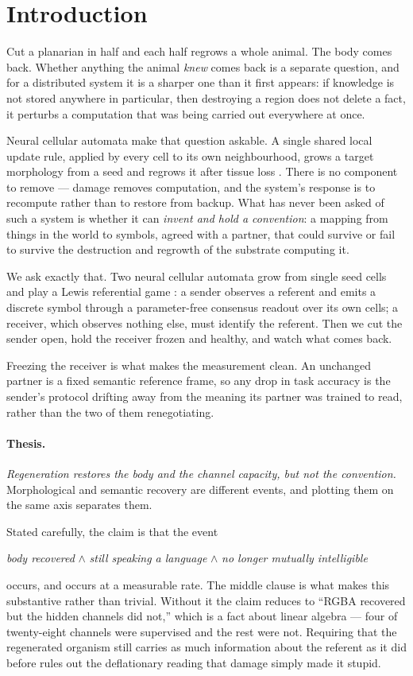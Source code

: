 \section{Introduction}
\label{sec:intro}

Cut a planarian in half and each half regrows a whole animal. The body comes
back. Whether anything the animal \emph{knew} comes back is a separate question,
and for a distributed system it is a sharper one than it first appears: if
knowledge is not stored anywhere in particular, then destroying a region does not
delete a fact, it perturbs a computation that was being carried out everywhere at
once.

Neural cellular automata make that question askable. A single shared local update
rule, applied by every cell to its own neighbourhood, grows a target morphology
from a seed and regrows it after tissue loss
\citep{mordvintsev2020growing}. There is no component to remove --- damage
removes computation, and the system's response is to recompute rather than to
restore from backup. What has never been asked of such a system is whether it can
\emph{invent and hold a convention}: a mapping from things in the world to
symbols, agreed with a partner, that could survive or fail to survive the
destruction and regrowth of the substrate computing it.

We ask exactly that. Two neural cellular automata grow from single seed cells and
play a Lewis referential game \citep{lewis1969convention}: a sender observes a
referent and emits a discrete symbol through a parameter-free consensus readout
over its own cells; a receiver, which observes nothing else, must identify the
referent. Then we cut the sender open, hold the receiver frozen and healthy, and
watch what comes back.

Freezing the receiver is what makes the measurement clean. An unchanged partner
is a fixed semantic reference frame, so any drop in task accuracy is the sender's
protocol drifting away from the meaning its partner was trained to read, rather
than the two of them renegotiating.

\paragraph{Thesis.} \emph{Regeneration restores the body and the channel
capacity, but not the convention.} Morphological and semantic recovery are
different events, and plotting them on the same axis separates them.

Stated carefully, the claim is that the event
%
\begin{center}
  \emph{body recovered} $\wedge$ \emph{still speaking a language} $\wedge$
  \emph{no longer mutually intelligible}
\end{center}
%
occurs, and occurs at a measurable rate. The middle clause is what makes this
substantive rather than trivial. Without it the claim reduces to ``RGBA recovered
but the hidden channels did not,'' which is a fact about linear algebra --- four
of twenty-eight channels were supervised and the rest were not. Requiring that
the regenerated organism still carries as much information about the referent as
it did before rules out the deflationary reading that damage simply made it
stupid.

